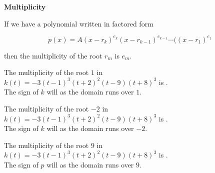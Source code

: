 \documentclass{ximera}
\author{Lee Wayand}
\begin{document}
\begin{exercise}






\begin{idea} \textbf{\textcolor{blue!55!black}{Multiplicity}}


If we have a polynomial written in factored form

\[
p(x) = A (x-r_k)^{e_k} (x-r_{k-1})^{e_{k-1}}  \cdots ((x-r_1)^{e_1}
\]

then the multiplicity of the root $r_m$ is $e_m$. \\





\end{idea}









\begin{question}



The multiplicity of the root $1$ in $k(t) = -3(t - 1)^3 (t + 2)^2 (t - 9) (t + 8)^3$ is . \\



The sign of $k$ will  as the domain runs over $1$.


\end{question}











\begin{question}



The multiplicity of the root $-2$ in $k(t) = -3(t - 1)^3 (t + 2)^2 (t - 9) (t + 8)^3$ is . \\



The sign of $k$ will  as the domain runs over $-2$.


\end{question}











\begin{question}



The multiplicity of the root $9$ in $k(t) = -3(t - 1)^3 (t + 2)^2 (t - 9) (t + 8)^3$ is . \\



The sign of $p$ will  as the domain runs over $9$.


\end{question}














\end{exercise}
\end{document}
